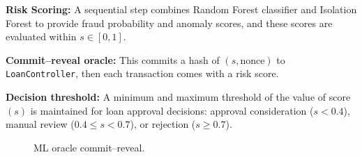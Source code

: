 \textbf{Risk Scoring:} A sequential step combines Random Forest classifier and Isolation Forest to provide fraud probability and anomaly scores, and these scores are evaluated within $s \in [0,1]$.

\textbf{Commit--reveal oracle:} This commits a hash of $(s, \text{nonce})$ to \texttt{LoanController}, then each transaction comes with a risk score.

\textbf{Decision threshold:} A minimum and maximum threshold of the value of score $(s)$ is maintained for loan approval decisions: approval consideration ($s < 0.4$), manual review ($0.4 \le s < 0.7$), or rejection ($s \ge 0.7$).

\begin{figure}[H]
\centering
{}
\caption[ML oracle commit--reveal]{ML oracle commit--reveal.}
\label{fig:ml-oracle-commit-reveal}
\end{figure}


